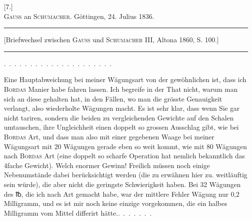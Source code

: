 \clearpage\begingroup{}
\begin{center}
[7.]\\[.7em]
\textsc{Gauss} an \textsc{Schumacher}. Göttingen, 24. Julius 1836.
\par\medskip\rule{.78\textwidth}{.35pt}\par
{\small [Briefwechsel zwischen \textsc{Gauss} und \textsc{Schumacher} III, Altona 1860, S. 100.]}\par
\rule{.78\textwidth}{.35pt}
\end{center}
\noindent .\ .\ .\ .\ .\ .\ .\ .\ .\ .\ .\ .\ .\ .\ .\ .\ .\ .\ .\ .\ .
\par\noindent\hspace*{\parindent}Eine Hauptabweichung bei meiner Wägungsart von der gewöhnlichen
ist, dass ich \textsc{Bordas} Manier habe fahren lassen. Ich begreife in der That
nicht, warum man sich an diese gehalten hat, in den Fällen, wo man die
grösste Genauigkeit verlangt, also  wiederholte Wägungen macht. Es ist
sehr klar, dass wenn Sie gar nicht tariren, sondern die beiden zu vergleichenden
Gewichte auf den Schalen umtauschen, ihre Ungleichheit einen doppelt
so grossen Ausschlag gibt, wie bei \textsc{Bordas} Art, und dass man also mit einer
gegebenen Waage bei meiner Wägungsart mit 20 Wägungen gerade eben so
weit kommt, wie mit 80 Wägungen nach \textsc{Bordas} Art (eine doppelt so scharfe
Operation hat nemlich bekanntlich das 4fache Gewicht). Welch enormer Gewinn!
Freilich müssen noch einige Nebenumstände dabei berücksichtigt werden
(die zu erwähnen hier zu. weitläuftig sein würde), die aber nicht die geringste
Schwierigkeit haben. Bei 32 Wägungen des {℔}, die ich nach  Art
gemacht habe, war der mittlere Fehler  Wägung nur 0,2 Milligramm,
und es ist mir noch keine einzige vorgekommen, die ein halbes Milligramm
vom Mittel differirt hätte.\quad .\ .\ .\ .\ .\ .\ .
\clearpage\endgroup
